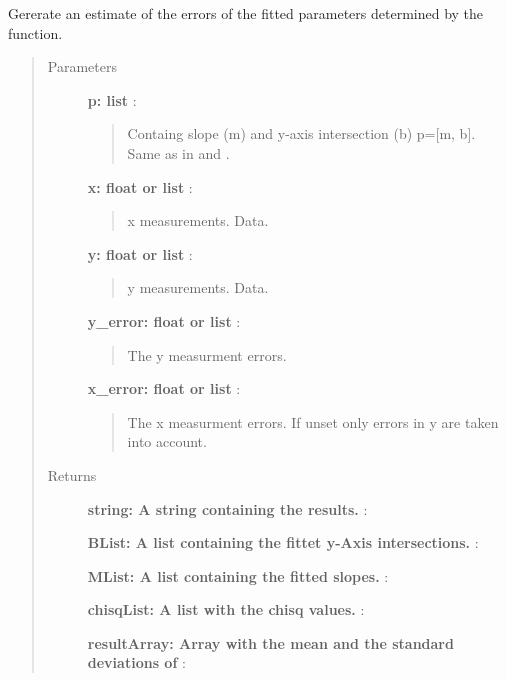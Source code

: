 \documentclass[a4paper,10pt,english]{sphinxmanual}
\begin{document}
\begin{fulllineitems}
\label{functions:astrolyze.functions.astro_functions.line_monte_carlo}
Gererate an estimate of the errors of the fitted parameters determined by
the {\hyperref[functions:astrolyze.functions.astro_functions.line_fit]{}} function.
\begin{quote}\begin{description}
\item[{Parameters }] \leavevmode
\textbf{p: list} :
\begin{quote}

Containg slope (m) and y-axis intersection (b) p={[}m, b{]}. Same as in
{\hyperref[functions:astrolyze.functions.astro_functions.line]{}} and .
\end{quote}

\textbf{x: float or list} :
\begin{quote}

x measurements. Data.
\end{quote}

\textbf{y: float or list} :
\begin{quote}

y measurements. Data.
\end{quote}

\textbf{y\_error: float or list} :
\begin{quote}

The y measurment errors.
\end{quote}

\textbf{x\_error: float or list} :
\begin{quote}

The x measurment errors. If unset only errors in y are taken into
account.
\end{quote}

\item[{Returns }] \leavevmode
\textbf{string: A string containing the results.} :

\textbf{BList: A list containing the fittet y-Axis intersections.} :

\textbf{MList: A list containing the fitted slopes.} :

\textbf{chisqList: A list with the chisq values.} :

\textbf{resultArray: Array with the mean and the standard deviations of} :
\begin{quote}


\end{quote}
\end{description}
\end{quote}
\end{fulllineitems}
\end{document}
